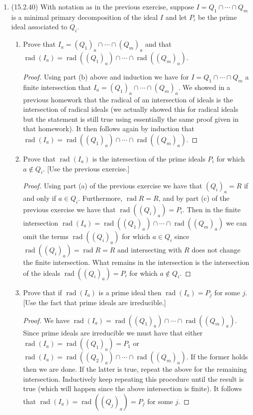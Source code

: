 \documentclass[11pt]{article}
\DeclareMathOperator{\rad}{rad}
\begin{document}
\begin{enumerate}
\begin{enumerate}
\begin{proof}
            Now suppose $a\not\in P$. Then for any element $r\in Q_a$ we have $ar\in Q$. If $r\not\in Q$, we have $a\in \rad Q = P$, which is a contradiction. Hence $r\in Q$ which gives the reverse containment and hence the equality $Q_a = Q$ (when $a\not\in P$).
        \end{proof}
    \end{enumerate}
    \item (15.2.40) With notation as in the previous exercise, suppose $I=Q_1\cap\cdots\cap Q_m$ is a minimal primary decomposition of the ideal $I$ and let $P_i$ be the prime ideal associated to $Q_i$. \begin{enumerate}
        \item Prove that $I_a = (Q_1)_a\cap\cdots\cap (Q_m)_a$ and that $\rad (I_a) = \rad((Q_1)_a)\cap\cdots\cap \rad((Q_m)_a)$. \begin{proof}
            Using part (b) above and induction we have for $I = Q_1\cap\cdots\cap Q_m$ a finite intersection that $I_a = (Q_1)_a\cap\cdots\cap (Q_m)_a$. We showed in a previous homework that the radical of an intersection of ideals is the intersection of radical ideals (we actually showed this for radical ideals but the statement is still true using essentially the same proof given in that homework). It then follows again by induction that $\rad (I_a) = \rad((Q_1)_a)\cap\cdots\cap \rad((Q_m)_a)$.
        \end{proof}
        \item Prove that $\rad (I_a)$ is the intersection of the prime ideals $P_i$ for which $a\not\in Q_i$. [Use the previous exercise.] \begin{proof}
            Using part (a) of the previous exercise we have that $(Q_i)_a = R$ if and only if $a\in Q_i$. Furthermore, $\rad R = R$, and by part (c) of the previous exercise we have that $\rad ((Q_i)_a) = P_i$. Then in the finite intersection $\rad (I_a) = \rad((Q_1)_a)\cap\cdots\cap \rad((Q_m)_a)$ we can omit the terms $\rad((Q_i)_a)$ for which $a\in Q_i$ since $\rad((Q_i)_a) = \rad R = R$ and intersecting with $R$ does not change the finite intersection. What remains in the intersection is the intersection of the ideals $\rad ((Q_i)_a) = P_i$ for which $a\not\in Q_i$.
        \end{proof}
        \item Prove that if $\rad(I_a)$ is a prime ideal then $\rad(I_a) = P_j$ for some $j$. [Use the fact that prime ideals are irreducible.] \begin{proof}
            We have $\rad (I_a) = \rad((Q_1)_a)\cap\cdots\cap \rad((Q_m)_a)$. Since prime ideals are irreducible we must have that either $\rad (I_a) = \rad((Q_1)_a) = P_1$ or $\rad (I_a) = \rad((Q_2)_a)\cap\cdots\cap \rad((Q_m)_a)$. If the former holds then we are done. If the latter is true, repeat the above for the remaining intersection. Inductively keep repeating this procedure until the result is true (which will happen since the above intersection is finite). It follows that $\rad(I_a) = \rad((Q_j)_a) = P_j$ for some $j$.

\end{proof}
\end{enumerate}
\end{enumerate}
\end{document}
